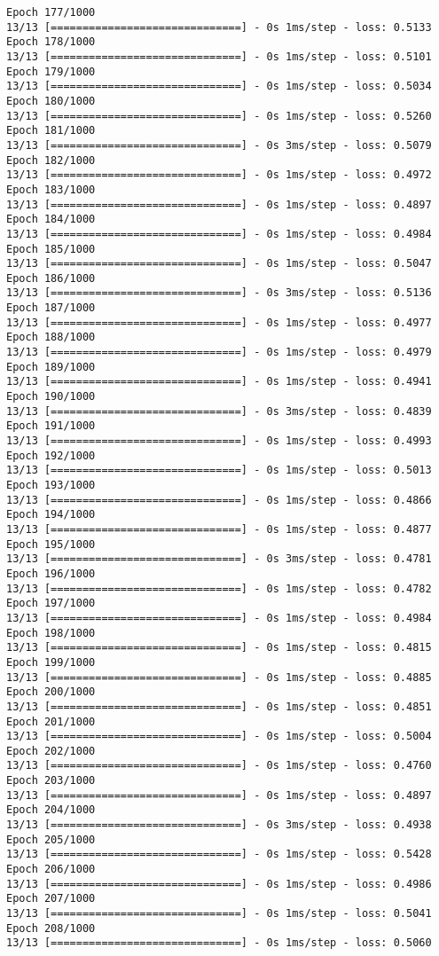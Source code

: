 \documentclass[11pt]{article}
\begin{document}
\begin{Verbatim}[commandchars=\\\{\}]
Epoch 177/1000
13/13 [==============================] - 0s 1ms/step - loss: 0.5133
Epoch 178/1000
13/13 [==============================] - 0s 1ms/step - loss: 0.5101
Epoch 179/1000
13/13 [==============================] - 0s 1ms/step - loss: 0.5034
Epoch 180/1000
13/13 [==============================] - 0s 1ms/step - loss: 0.5260
Epoch 181/1000
13/13 [==============================] - 0s 3ms/step - loss: 0.5079
Epoch 182/1000
13/13 [==============================] - 0s 1ms/step - loss: 0.4972
Epoch 183/1000
13/13 [==============================] - 0s 1ms/step - loss: 0.4897
Epoch 184/1000
13/13 [==============================] - 0s 1ms/step - loss: 0.4984
Epoch 185/1000
13/13 [==============================] - 0s 1ms/step - loss: 0.5047
Epoch 186/1000
13/13 [==============================] - 0s 3ms/step - loss: 0.5136
Epoch 187/1000
13/13 [==============================] - 0s 1ms/step - loss: 0.4977
Epoch 188/1000
13/13 [==============================] - 0s 1ms/step - loss: 0.4979
Epoch 189/1000
13/13 [==============================] - 0s 1ms/step - loss: 0.4941
Epoch 190/1000
13/13 [==============================] - 0s 3ms/step - loss: 0.4839
Epoch 191/1000
13/13 [==============================] - 0s 1ms/step - loss: 0.4993
Epoch 192/1000
13/13 [==============================] - 0s 1ms/step - loss: 0.5013
Epoch 193/1000
13/13 [==============================] - 0s 1ms/step - loss: 0.4866
Epoch 194/1000
13/13 [==============================] - 0s 1ms/step - loss: 0.4877
Epoch 195/1000
13/13 [==============================] - 0s 3ms/step - loss: 0.4781
Epoch 196/1000
13/13 [==============================] - 0s 1ms/step - loss: 0.4782
Epoch 197/1000
13/13 [==============================] - 0s 1ms/step - loss: 0.4984
Epoch 198/1000
13/13 [==============================] - 0s 1ms/step - loss: 0.4815
Epoch 199/1000
13/13 [==============================] - 0s 1ms/step - loss: 0.4885
Epoch 200/1000
13/13 [==============================] - 0s 1ms/step - loss: 0.4851
Epoch 201/1000
13/13 [==============================] - 0s 1ms/step - loss: 0.5004
Epoch 202/1000
13/13 [==============================] - 0s 1ms/step - loss: 0.4760
Epoch 203/1000
13/13 [==============================] - 0s 1ms/step - loss: 0.4897
Epoch 204/1000
13/13 [==============================] - 0s 3ms/step - loss: 0.4938
Epoch 205/1000
13/13 [==============================] - 0s 1ms/step - loss: 0.5428
Epoch 206/1000
13/13 [==============================] - 0s 1ms/step - loss: 0.4986
Epoch 207/1000
13/13 [==============================] - 0s 1ms/step - loss: 0.5041
Epoch 208/1000
13/13 [==============================] - 0s 1ms/step - loss: 0.5060

\end{Verbatim}
\end{document}
